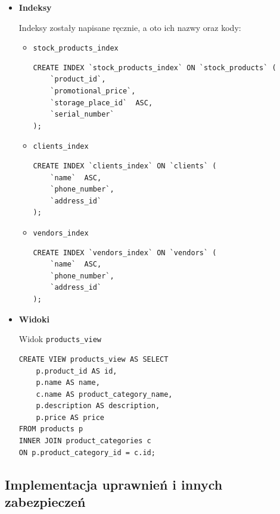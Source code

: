 \begin{itemize}
	
	\item \textbf{Indeksy}
	
	Indeksy zostały napisane ręcznie, a oto ich nazwy oraz kody:
	
	\begin{itemize}
		
		\item \lstinline|stock_products_index|
		
\begin{lstlisting}[style=SQLite]
CREATE INDEX `stock_products_index` ON `stock_products` (
	`product_id`,
	`promotional_price`,
	`storage_place_id`	ASC,
	`serial_number`
);
\end{lstlisting}
		
		\item \lstinline|clients_index|
		
\begin{lstlisting}[style=SQLite]
CREATE INDEX `clients_index` ON `clients` (
	`name`	ASC,
	`phone_number`,
	`address_id`
);
\end{lstlisting}
		
		\item \lstinline|vendors_index|
		
\begin{lstlisting}[style=SQLite]
CREATE INDEX `vendors_index` ON `vendors` (
	`name`	ASC,
	`phone_number`,
	`address_id`
);
		\end{lstlisting}
		
	\end{itemize}
	
	\item \textbf{Widoki}
	
	Widok \lstinline|products_view|
	
\begin{lstlisting}[style=SQLite]	
CREATE VIEW products_view AS SELECT
	p.product_id AS id,
	p.name AS name,
	c.name AS product_category_name,
	p.description AS description,
	p.price AS price
FROM products p
INNER JOIN product_categories c
ON p.product_category_id = c.id;
\end{lstlisting}
	
\end{itemize}

\subsection{Implementacja uprawnień i innych zabezpieczeń}

